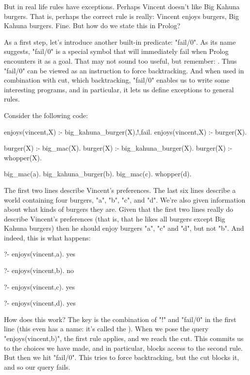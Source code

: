 But in real life rules have exceptions.  Perhaps Vincent doesn't like
Big Kahuna burgers.  That is, perhaps the correct rule is really:
Vincent enjoys burgers,  Big Kahuna burgers.  Fine.
But how do we state this in Prolog?

As a first step, let's introduce another built-in predicate:
"fail/0".  As its name suggests, "fail/0" is a special
symbol that will immediately fail when Prolog encounters it as a goal.
That may not sound too useful, but remember: .  Thus "fail/0" can be viewed as an instruction
to force backtracking.  And when used in combination with cut, which
 backtracking, "fail/0" enables us to write some
interesting programs, and in particular, it lets us define exceptions
to general rules.


Consider the following code:
\begin{LPNcodedisplay}
enjoys(vincent,X) :- big_kahuna_burger(X),!,fail.
enjoys(vincent,X) :- burger(X).

burger(X) :- big_mac(X).
burger(X) :- big_kahuna_burger(X).
burger(X) :- whopper(X).

big_mac(a).
big_kahuna_burger(b).
big_mac(c).
whopper(d).
\end{LPNcodedisplay}

The first two lines describe Vincent's preferences.  The last six
lines describe a world containing four burgers, "a", "b",
"c", and "d".  We're also given information about what kinds of
burgers they are.  Given that the first two lines really do describe
Vincent's preferences (that is, that he likes all burgers except Big
Kahuna burgers) then he should enjoy burgers "a", "c" and
"d", but not "b". And indeed, this is what happens:
\begin{LPNcodedisplay}
?- enjoys(vincent,a).
yes

?- enjoys(vincent,b).
no

?- enjoys(vincent,c).
yes

?- enjoys(vincent,d).
yes
\end{LPNcodedisplay}

How does this work?  The key is the combination of "!" and
"fail/0" in the first line (this even has a name: it's called the
).  When we pose the query
"enjoys(vincent,b)", the first rule applies, and we reach the
cut.  This commits us to the choices we have made, and in particular,
blocks access to the second rule.  But then we hit "fail/0".  This
tries to force backtracking, but the cut blocks it, and so our query
fails.

